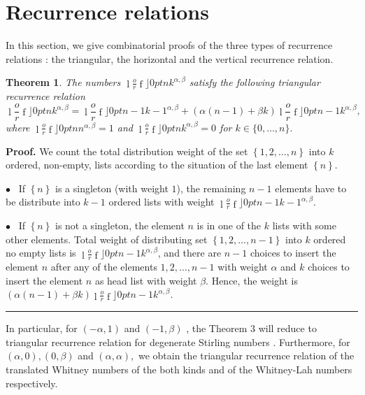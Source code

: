 \documentclass{article}
\newcommand {\lah}[2]{\genfrac\lfloor \rfloor{0pt}{}{#1}{#2}}
\newtheorem{theorem}{Theorem}
\newenvironment{proof}[1][Proof]{\noindent\textbf{#1.} }{\ \rule{0.5em}{0.5em}}
\begin{document}
\section{Recurrence relations}
In this section, we give combinatorial proofs of the three types of
recurrence relations : the triangular, the horizontal and the vertical
recurrence relation.

\begin{theorem}
The numbers $\lah{n}{k}^{\alpha ,\beta }$ satisfy the
following triangular recurrence relation%
\begin{equation}
\lah{n}{k}^{\alpha ,\beta }=\lah{n-1}{k-1}^{\alpha ,\beta }+\left( \alpha \left( n-1\right) +\beta
k\right) \lah{n-1}{k}^{\alpha ,\beta },
\end{equation}%
where $\lah{n}{n}^{\alpha ,\beta }=1$ and $\lah{n}{k}^{\alpha ,\beta }=0$ for $k\in\{0,\ldots,n \}.$
\end{theorem}

\begin{proof}
We count the total distribution weight of the set $\left\{ 1,2,\ldots
,n\right\} $ into $k$ ordered, non-empty, lists according to the situation
of the last element $\left\{ n\right\} $.

$\bullet $ \ If $\left \{ n\right \} $ is a singleton (with weight $1$), the
remaining $n-1$ elements have to be distribute into $k-1$ ordered lists with
weight $\lah{n-1}{k-1}^{\alpha ,\beta }$.

$\bullet $ \ If $\left\{ n\right\} $ is not a singleton, the element $n$ is
in one of the $k$ lists with some other elements. Total weight of
distributing set $\left\{ 1,2,\ldots ,n-1\right\} $ into $k$ ordered no
empty lists is $\lah{n-1}{k}^{\alpha ,\beta }$, and
there are $n-1$ choices to insert the element $n$ after any of the elements $%
1,2,\ldots ,n-1$ with weight $\alpha $ and $k$ choices to insert the element
$n$ as head list with weight $\beta $. Hence, the weight is $\left( \alpha
\left( n-1\right) +\beta k\right) \lah{n-1}{k}^{\alpha
,\beta }.$
\end{proof}

In particular, for $\left( -\alpha ,1\right) $ and $\left( -1,\beta \right) $%
, the Theorem $3$ will reduce to triangular recurrence relation for
degenerate Stirling numbers \cite{MR531621}. Furthermore, for $\left( \alpha
,0\right) ,\left( 0,\beta \right) $ and $\left( \alpha ,\alpha \right) ,$ we
obtain the triangular recurrence relation of the translated Whitney numbers
of the both kinds and of the Whitney-Lah numbers \cite{MR25} respectively.
\end{document}
